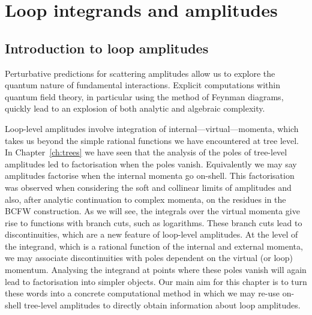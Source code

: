 \chapter{Loop integrands and amplitudes}
\label{ch:loopamps}


\section{Introduction to loop amplitudes}
\label{sec:3.1}

Perturbative predictions for scattering amplitudes allow us to explore the
quantum nature of fundamental interactions. Explicit computations within
quantum field theory, in particular using the method of Feynman diagrams,
quickly lead to an explosion of both analytic and algebraic complexity.

Loop-level amplitudes involve integration of internal---virtual---momenta,
which takes us beyond the simple rational functions we have encountered at tree
level. In Chapter~\ref{ch:trees} we have seen that the analysis of the poles of
tree-level amplitudes led to factorisation when the poles vanish. Equivalently
we may say amplitudes factorise when the internal momenta go on-shell. This
factorisation was observed when considering the soft and collinear limits of
amplitudes and also, after analytic continuation to complex momenta, on the
residues in the BCFW construction. As we will see, the integrals over the
virtual momenta give rise to functions with branch cuts, such as logarithms.
These branch cuts lead to discontinuities, which are a new feature of
loop-level amplitudes.  At the level of the integrand, which is a rational
function of the internal and external momenta, we may associate discontinuities
with poles dependent on the virtual (or loop) momentum. Analysing the integrand
at points where these poles vanish will again lead to factorisation into
simpler objects. Our main aim for this chapter is to turn these words into a
concrete computational method in which we may re-use on-shell tree-level
amplitudes to directly obtain information about loop amplitudes.

